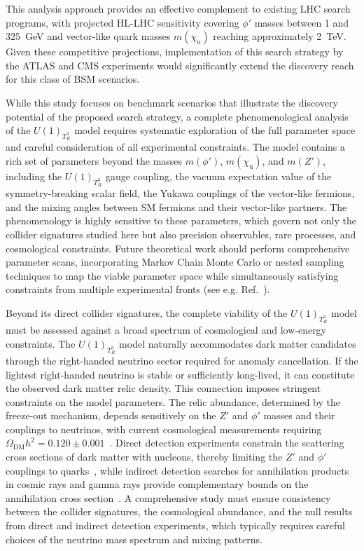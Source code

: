 This analysis approach provides an effective complement to existing LHC search programs, with projected HL-LHC sensitivity covering $\phi'$ masses between 1 and 325~\textrm{GeV} and vector-like quark masses $m(\chi_{\mathrm{u}})$ reaching approximately 2~\textrm{TeV}. Given these competitive projections, implementation of this search strategy by the ATLAS and CMS experiments would significantly extend the discovery reach for this class of BSM scenarios.

While this study focuses on benchmark scenarios that illustrate the discovery potential of the proposed search strategy, a complete phenomenological analysis of the $U(1)_{T^3_R}$ model requires systematic exploration of the full parameter space and careful consideration of all experimental constraints. The model contains a rich set of parameters beyond the masses $m(\phi')$, $m(\chi_\mathrm{u})$, and $m(Z')$, including the $U(1)_{T^3_R}$ gauge coupling, the vacuum expectation value of the symmetry-breaking scalar field, the Yukawa couplings of the vector-like fermions, and the mixing angles between SM fermions and their vector-like partners. The phenomenology is highly sensitive to these parameters, which govern not only the collider signatures studied here but also precision observables, rare processes, and cosmological constraints. Future theoretical work should perform comprehensive parameter scans, incorporating Markov Chain Monte Carlo or nested sampling techniques to map the viable parameter space while simultaneously satisfying constraints from multiple experimental fronts (see e.g. Ref.~\cite{Ardila-Tafurth:2025qdf}).

Beyond its direct collider signatures, the complete viability of the $U(1)_{T^3_R}$ model must be assessed against a broad spectrum of cosmological and low-energy constraints. The $U(1)_{T^3_R}$ model naturally accommodates dark matter candidates through the right-handed neutrino sector required for anomaly cancellation. If the lightest right-handed neutrino is stable or sufficiently long-lived, it can constitute the observed dark matter relic density. This connection imposes stringent constraints on the model parameters. The relic abundance, determined by the freeze-out mechanism, depends sensitively on the $Z'$ and $\phi'$ masses and their couplings to neutrinos, with current cosmological measurements requiring $\Omega_{\mathrm{DM}} h^2 = 0.120 \pm 0.001$~\cite{Planck:2018vyg}. Direct detection experiments constrain the scattering cross sections of dark matter with nucleons, thereby limiting the $Z'$ and $\phi'$ couplings to quarks~\cite{XENON:2026qow,LUX-ZEPLIN:2022qhg}, while indirect detection searches for annihilation products in cosmic rays and gamma rays provide complementary bounds on the annihilation cross section~\cite{Bertone2005_DM_review}. A comprehensive study must ensure consistency between the collider signatures, the cosmological abundance, and the null results from direct and indirect detection experiments, which typically requires careful choices of the neutrino mass spectrum and mixing patterns.

